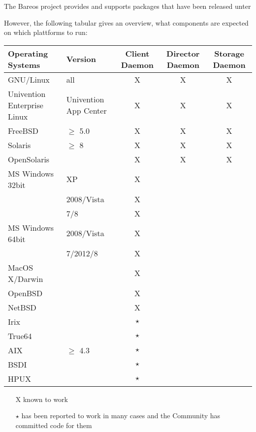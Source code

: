

The Bareos project provides and supports packages that have been released unter

However, the following tabular gives an overview, what components are expected on which plattforms to run:

\begin{tabular}[h]{|l|l|c|c|c|}
  \hline
  Operating Systems & Version & Client \small{Daemon} & Director \small{Daemon} & Storage \small{Daemon} \\
  \hline
  \hline
  GNU/Linux  & all & X & X & X \\
  \hline
  Univention Enterprise Linux & Univention App Center & X & X & X \\
  \hline
  FreeBSD & $\geq$ 5.0 & X & X & X
  \\
  \hline
  Solaris & $\geq$ 8 & X & X & X \\
  \hline
  OpenSolaris & ~ & X & X & X \\
  \hline
  \hline
  MS Windows 32bit & XP & X  &  &  \\
  ~ & 2008/Vista & X  &  &  \\
  ~ & 7/8 & X  &  &  \\
  \hline
  MS Windows 64bit& 2008/Vista & X  &  &  \\
  ~ & 7/2012/8 & X  &  &  \\
  \hline
  \hline
  MacOS X/Darwin & ~ & X &  &  \\
  \hline
  OpenBSD & ~ & X &  & ~ \\
  \hline
  NetBSD & ~ & X &  & ~ \\
  \hline
  Irix & ~ & $\star$ & ~ & ~ \\
  \hline
  True64 & ~ & $\star$ & ~ & ~ \\
  \hline
  AIX & $\geq$ 4.3 & $\star$ & ~ & ~ \\
  \hline
  BSDI & ~ & $\star$ & ~ & ~ \\
  \hline
  HPUX & ~ & $\star$ & ~ & ~ \\
  \hline
\end{tabular}

\begin{itemize}
\item[X] known to work
\item[$\star$] has been reported to work in many cases and the Community
   has committed code for them
\end{itemize}


